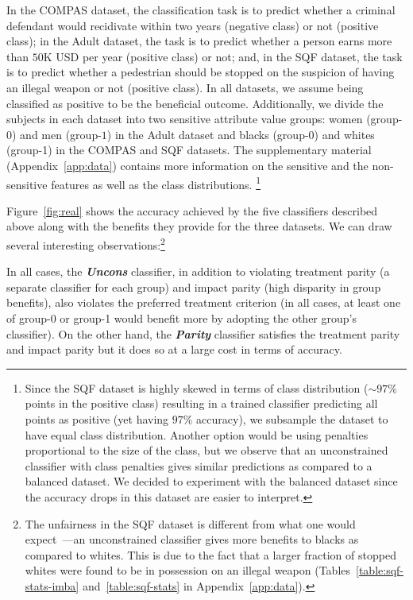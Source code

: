 \documentclass{article}
\newcommand{\xhdr}[1]{\vspace{0mm}\noindent{{\bf #1.}}}
\newcommand{\emphb}[1]{\textbf{\emph{#1}}}
\begin{document}
In the COMPAS dataset, the classification task is to predict whether a criminal defendant would recidivate within two years (negative class) or not (positive class);
in the Adult dataset, the task is to predict whether a person earns more than $50$K USD per year (positive class) or not; and, in the SQF dataset, the task is to predict
whether a pedestrian should be stopped on the suspicion of having an illegal weapon or not (positive class). In all datasets, we assume being classified as positive
to be the beneficial outcome.
Additionally, we divide the subjects in each dataset into two sensitive attribute value groups: women (group-$0$) and men (group-$1$) in the Adult dataset and
blacks (group-0) and whites (group-1) in the COMPAS and SQF datasets.
The supplementary material (Appendix~\ref{app:data}) contains more information on the sensitive and the non-sensitive features as well as the class distributions.
\footnote{\scriptsize Since the SQF dataset is highly skewed in terms of class distribution ($\sim$$97\%$ points in the positive class) resulting in a trained classifier predicting all points as positive
(yet having $97\%$ accuracy), we subsample the dataset to have equal class distribution. Another option would be using penalties proportional to the size of the class, but we observe
that an unconstrained classifier with class penalties gives similar predictions as compared to a balanced dataset. We decided to experiment with the balanced dataset since
the accuracy drops in this dataset are easier to interpret.}



\xhdr{Results}
Figure~\ref{fig:real} shows the accuracy achieved by the five classifiers described above along with the benefits they provide for the three datasets.
We can draw several interesting observations:\footnote{\scriptsize The unfairness in the SQF dataset is different from what one would expect~\cite{nycly_sqf}---an unconstrained classifier gives more benefits to blacks as compared to whites. This is due to the fact that a larger fraction of stopped whites were found to be in possession on an illegal weapon (Tables~\ref{table:sqf-stats-imba} and~\ref{table:sqf-stats} in Appendix~\ref{app:data}).}

In all cases, the \emphb{Uncons} classifier, in addition to violating treatment parity (a separate classifier for each group) and impact parity (high disparity in group benefits), also violates the preferred
treatment criterion (in all cases, at least one of group-0 or group-1 would benefit more by adopting the other group'{}s classifier).
On the other hand, the \emphb{Parity} classifier satisfies the treatment parity and impact parity but it does so at a large cost in terms of accuracy.
\end{document}
